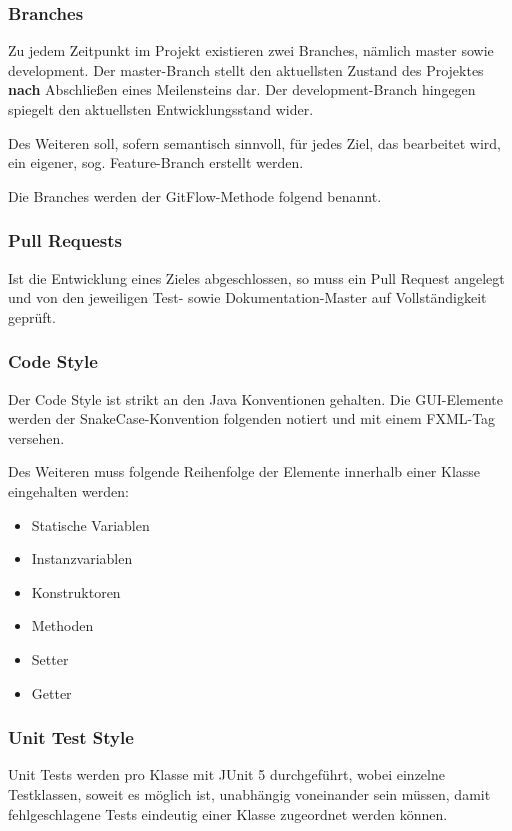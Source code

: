 \documentclass[a4paper]{scrreprt}
\begin{document}
\subsubsection{Branches}
Zu jedem Zeitpunkt im Projekt existieren zwei Branches, nämlich \glqq master\grqq{} sowie \glqq development\grqq{}. Der master-Branch stellt den aktuellsten Zustand des Projektes \textbf{nach} Abschließen eines Meilensteins dar. Der development-Branch hingegen spiegelt den aktuellsten Entwicklungsstand wider.

Des Weiteren soll, sofern semantisch sinnvoll, für jedes Ziel, das bearbeitet wird, ein eigener, sog. \glqq Feature-\grqq{}Branch erstellt werden.

Die Branches werden der \glqq GitFlow\grqq{}-Methode folgend benannt.

\subsubsection{Pull Requests}
Ist die Entwicklung eines Zieles abgeschlossen, so muss ein \glqq Pull Request\grqq{} angelegt und von den jeweiligen Test- sowie Dokumentation-Master auf Vollständigkeit geprüft.

\subsubsection{Code Style}
Der Code Style ist strikt an den Java Konventionen gehalten. Die GUI-Elemente werden der SnakeCase-Konvention folgenden notiert und mit einem FXML-Tag versehen.

Des Weiteren muss folgende Reihenfolge der Elemente innerhalb einer Klasse eingehalten werden:
\begin{itemize}
	\item Statische Variablen
	\item Instanzvariablen
	\item Konstruktoren
	\item Methoden
	\item Setter
	\item Getter
\end{itemize}

\subsubsection{Unit Test Style}
Unit Tests werden pro Klasse mit JUnit 5 durchgeführt, wobei einzelne Testklassen, soweit es möglich ist, unabhängig voneinander sein müssen, damit fehlgeschlagene Tests eindeutig einer Klasse zugeordnet werden können.
\end{document}
